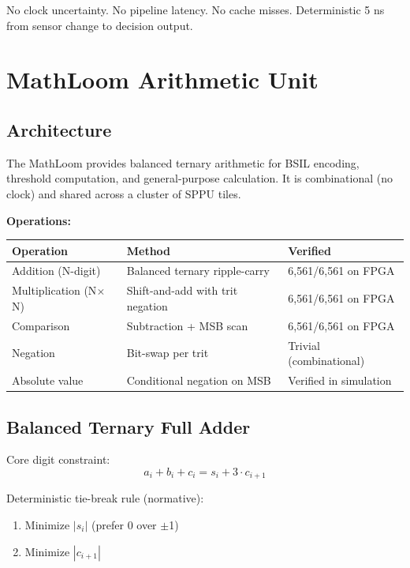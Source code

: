 \documentclass[11pt, a4paper]{article}
\begin{document}
No clock uncertainty. No pipeline latency. No cache misses.
Deterministic 5 ns from sensor change to decision output.

\section{MathLoom Arithmetic Unit}

\subsection{Architecture}

The MathLoom provides balanced ternary arithmetic for BSIL
encoding, threshold computation, and general-purpose calculation.
It is combinational (no clock) and shared across a cluster of
SPPU tiles.

\textbf{Operations:}
\begin{center}
\begin{tabular}{@{}lll@{}}
\toprule
\textbf{Operation} & \textbf{Method} & \textbf{Verified} \\
\midrule
Addition (N-digit) & Balanced ternary ripple-carry & 6,561/6,561 on FPGA \\
Multiplication (N$\times$N) & Shift-and-add with trit negation & 6,561/6,561 on FPGA \\
Comparison & Subtraction + MSB scan & 6,561/6,561 on FPGA \\
Negation & Bit-swap per trit & Trivial (combinational) \\
Absolute value & Conditional negation on MSB & Verified in simulation \\
\bottomrule
\end{tabular}
\end{center}

\subsection{Balanced Ternary Full Adder}

Core digit constraint:
\begin{equation}
  a_i + b_i + c_i = s_i + 3 \cdot c_{i+1}
\end{equation}

Deterministic tie-break rule (normative):
\begin{enumerate}[nosep]
  \item Minimize $|s_i|$ (prefer 0 over $\pm$1)
  \item Minimize $|c_{i+1}|$
\end{enumerate}
\end{document}
